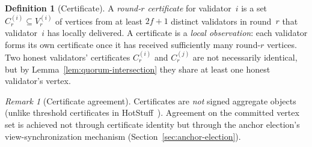 \documentclass[11pt,a4paper]{article}
\theoremstyle{definition}
\newtheorem{definition}[theorem]{Definition}
\theoremstyle{remark}
\newtheorem{remark}[theorem]{Remark}
\begin{document}
\begin{definition}[Certificate]\label{def:certificate}
A \emph{round-$r$ certificate} for validator~$i$ is a set
$C_r^{(i)} \subseteq V_r^{(i)}$ of vertices from at least $2f+1$
distinct validators in round~$r$ that validator~$i$ has locally delivered.
A certificate is a \emph{local observation}: each validator forms its own
certificate once it has received sufficiently many round-$r$ vertices.
Two honest validators' certificates $C_r^{(i)}$ and $C_r^{(j)}$ are not
necessarily identical, but by Lemma~\ref{lem:quorum-intersection} they
share at least one honest validator's vertex.
\end{definition}

\begin{remark}[Certificate agreement]\label{rem:certificate-agreement}
Certificates are \emph{not} signed aggregate objects (unlike threshold
certificates in HotStuff~\cite{yin2019hotstuff}).
Agreement on the committed vertex set is achieved not through certificate
identity but through the anchor election's view-synchronization mechanism
(Section~\ref{sec:anchor-election}).
\end{remark}
\end{document}
